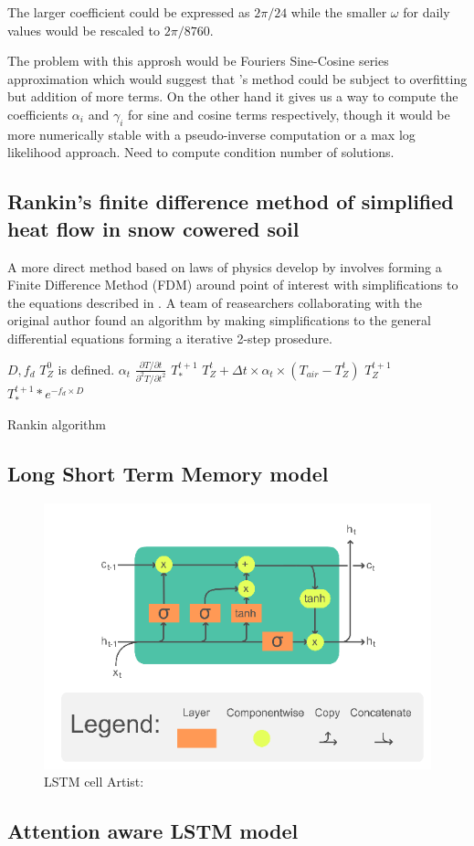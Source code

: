 The larger coefficient could be expressed as $2\pi/24$ while the smaller $\omega$ for daily values would be rescaled to $2\pi/8760$.

The problem with this approsh would be Fouriers Sine-Cosine series approximation which would suggest that \citeauthor{plauborg_simple_2002}'s method could be subject to overfitting but addition of more terms. On the other hand it gives us a way to compute the coefficients $\alpha_i$ and $\gamma_i$ for sine and cosine terms respectively, though it would be more numerically stable with a pseudo-inverse computation or a max log likelihood approach. \alert{Need to compute condition number of solutions.}

\subsection[Rankin algorithm]{Rankin's finite difference method of simplified heat flow in snow cowered soil}

A more direct method based on laws of physics develop by \citeauthor{karvonen_model_1988} involves forming a Finite Difference Method (FDM) around point of interest with simplifications to the equations described in . A team of reasearchers collaborating with the original author found an algorithm by making simplifications to the general differential equations forming a iterative 2-step prosedure.
\begin{algorithm}
	\begin{algorithmic}
		\Require $D,f_d$
		\Ensure $T_Z^0$ is defined.
		\State $\alpha_t$ \gets $\frac{\partial T / \partial t}{\partial^2 T / \partial t^2}$
			\State $T_*^{t+1}$ \gets $T_Z^t + \Delta t \times \alpha_t \times (T_{air}-T_Z^t)$
			\State $T_Z^{t+1}$ \gets $T_*^{t+1}*e^{-f_d\times D}$
		\EndForEach
	\end{algorithmic}
	\caption{Rankin algorithm}
\end{algorithm}
\subsection{Long Short Term Memory model}

\begin{figure}[ht]
	\centering
	\includegraphics[width=0.7\linewidth]{figures/LSTM_Cell}
	\caption{LSTM cell  Artist: \textcite{chevalier_english_2018}}
	\label{fig:lstmcell}
\end{figure}

\subsection[ILSTM]{Attention aware LSTM model}\cite{li_attention-aware_2022}

